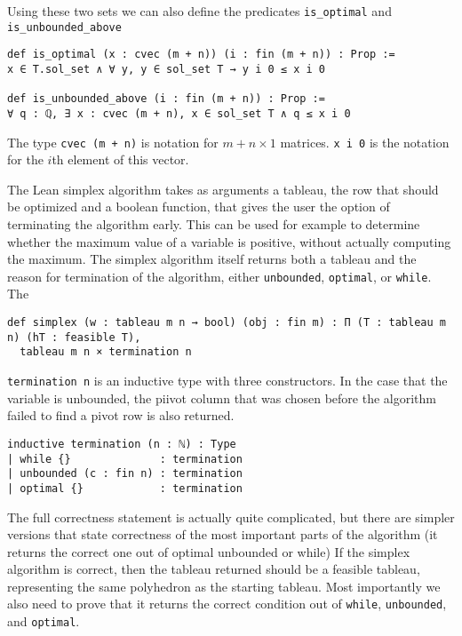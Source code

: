 \documentclass[11pt]{article} %
\begin{document}
Using these two sets we can also define the predicates \lstinline|is_optimal| and \lstinline|is_unbounded_above|
\begin{lstlisting}
def is_optimal (x : cvec (m + n)) (i : fin (m + n)) : Prop :=
x ∈ T.sol_set ∧ ∀ y, y ∈ sol_set T → y i 0 ≤ x i 0

def is_unbounded_above (i : fin (m + n)) : Prop :=
∀ q : ℚ, ∃ x : cvec (m + n), x ∈ sol_set T ∧ q ≤ x i 0
\end{lstlisting}

The type \lstinline|cvec (m + n)| is notation for $m + n \times 1$ matrices. \lstinline|x i 0| is the notation for the $i$th element of this vector.

The Lean simplex algorithm takes as arguments a tableau, the row that should be optimized and a boolean function, that gives the user the option of terminating the algorithm early. This can be used for example to determine whether the maximum value of a variable is positive, without actually computing the maximum. The simplex algorithm itself returns both a tableau and the reason for termination of the algorithm, either \lstinline|unbounded|, \lstinline|optimal|, or \lstinline|while|. The
\begin{lstlisting}
def simplex (w : tableau m n → bool) (obj : fin m) : Π (T : tableau m n) (hT : feasible T),
  tableau m n × termination n
\end{lstlisting}

\lstinline|termination n| is an inductive type with three constructors. In the case that the variable is unbounded, the piivot column that was chosen before the algorithm failed to find a pivot row is also returned.
\begin{lstlisting}
inductive termination (n : ℕ) : Type
| while {}              : termination
| unbounded (c : fin n) : termination
| optimal {}            : termination
\end{lstlisting}

\color{red} The full correctness statement is actually quite complicated, but there are simpler versions that state correctness of the most important parts of the algorithm (it returns the correct one out of optimal unbounded or while)\color{black}
If the simplex algorithm is correct, then the tableau returned should be a feasible tableau, representing the same polyhedron as the starting tableau. Most importantly we also need to prove that it returns the correct condition out of \lstinline|while|, \lstinline|unbounded|, and \lstinline|optimal|.
\end{document}
